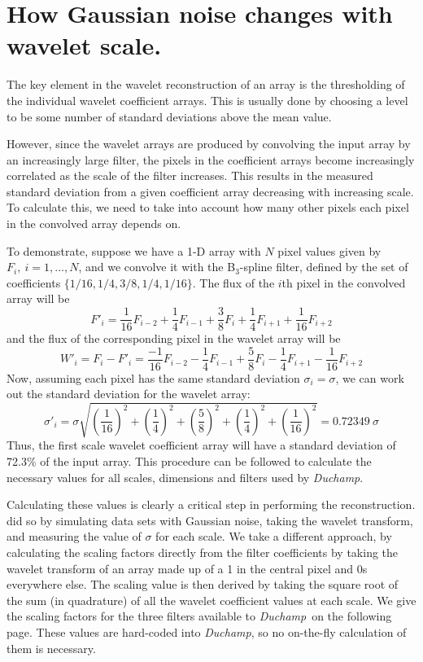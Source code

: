 \documentclass[12pt,a4paper]{article}
\newcommand{\duchamp}{\emph{Duchamp}}
\begin{document}
\section{How Gaussian noise changes with wavelet scale.}
\label{app-scaling}

The key element in the wavelet reconstruction of an array is the
thresholding of the individual wavelet coefficient arrays. This is
usually done by choosing a level to be some number of standard
deviations above the mean value.

However, since the wavelet arrays are produced by convolving the input
array by an increasingly large filter, the pixels in the coefficient
arrays become increasingly correlated as the scale of the filter
increases. This results in the measured standard deviation from a
given coefficient array decreasing with increasing scale. To calculate
this, we need to take into account how many other pixels each pixel in
the convolved array depends on.

To demonstrate, suppose we have a 1-D array with $N$ pixel values
given by $F_i,\ i=1,...,N$, and we convolve it with the B$_3$-spline
filter, defined by the set of coefficients
$\{1/16,1/4,3/8,1/4,1/16\}$. The flux of the $i$th pixel in the
convolved array will be
\[
F'_i = \frac{1}{16}F_{i-2} + \frac{1}{4}F_{i-1} + \frac{3}{8}F_{i}
+ \frac{1}{4}F_{i+1} + \frac{1}{16}F_{i+2}
\]
and the flux of the corresponding pixel in the wavelet array will be 
\[
W'_i = F_i - F'_i = \frac{-1}{16}F_{i-2} - \frac{1}{4}F_{i-1} + \frac{5}{8}F_{i}
- \frac{1}{4}F_{i+1} - \frac{1}{16}F_{i+2}
\]
Now, assuming each pixel has the same standard deviation
$\sigma_i=\sigma$, we can work out the standard deviation for the
wavelet array:
\[
\sigma'_i = \sigma \sqrt{\left(\frac{1}{16}\right)^2 + \left(\frac{1}{4}\right)^2
  + \left(\frac{5}{8}\right)^2 + \left(\frac{1}{4}\right)^2 + \left(\frac{1}{16}\right)^2}
          = 0.72349\ \sigma
\]
Thus, the first scale wavelet coefficient array will have a standard
deviation of 72.3\% of the input array. This procedure can be followed
to calculate the necessary values for all scales, dimensions and
filters used by \duchamp.

Calculating these values is clearly a critical step in performing the
reconstruction. \citet{starck02:book} did so by simulating data sets
with Gaussian noise, taking the wavelet transform, and measuring the
value of $\sigma$ for each scale. We take a different approach, by
calculating the scaling factors directly from the filter coefficients
by taking the wavelet transform of an array made up of a 1 in the
central pixel and 0s everywhere else. The scaling value is then
derived by taking the square root of the sum (in quadrature) of all
the wavelet coefficient values at each scale. We give the scaling
factors for the three filters available to \duchamp\ on the following
page. These values are hard-coded into \duchamp, so no on-the-fly
calculation of them is necessary.
\end{document}
